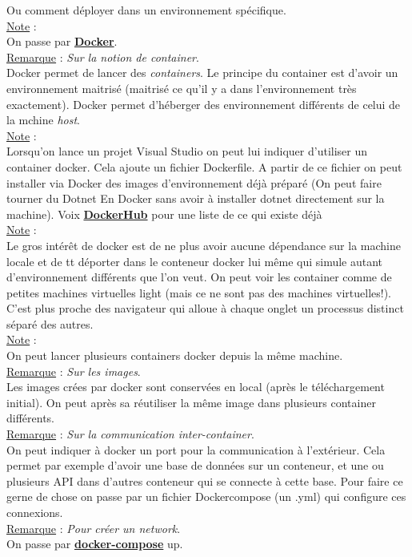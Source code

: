 \documentclass[a4paper,12pt,twoside]{article}
\newcommand{\urlcolor}{magenta}  %
\newcommand{\keycolor}{purple} %
\newcommand{\incode}[1]{{\footnotesize\ttfamily #1}} %
\newcommand{\rem}[2]{\noindent\underline{Remarque} : \textit{#1}.\\ \indent #2}
\newcommand{\note}[1]{\noindent\underline{Note} : \\ \indent #1}
\newcommand{\keyref}[2]{\hypersetup{urlcolor=\keycolor} \href{#1}{\textbf{#2}}\hypersetup{urlcolor=\urlcolor}}
\begin{document}
Ou comment déployer dans un environnement spécifique. \\

\note{On passe par \keyref{https://www.docker.com/get-started}{Docker}.}\\

\rem{Sur la notion de container}{Docker permet de lancer des \textit{containers}. Le principe du container est d'avoir un environnement maitrisé (maitrisé ce qu'il y a dans l'environnement très exactement). Docker permet d'héberger des environnement différents de celui de la mchine \textit{host}.}\\

\note{Lorsqu'on lance un projet Visual Studio on peut lui indiquer d'utiliser un container docker. Cela ajoute un fichier \incode{Dockerfile}. A partir de ce fichier on peut installer via Docker des images d'environnement déjà préparé (On peut faire tourner du Dotnet En Docker sans avoir à installer dotnet directement sur la machine). Voix \keyref{https://docs.docker.com/docker-hub/}{DockerHub} pour une liste de ce qui existe déjà}\\

\note{Le gros intérêt de docker est de ne plus avoir aucune dépendance sur la machine locale et de tt déporter dans le conteneur docker lui même qui simule autant d'environnement différents que l'on veut. On peut voir les container comme de petites machines virtuelles light (mais ce ne sont pas des machines virtuelles!). C'est plus proche des navigateur qui alloue à chaque onglet un processus distinct séparé des autres.}\\

\note{On peut lancer plusieurs containers docker depuis la même machine.}\\

\rem{Sur les images}{Les images crées par docker sont conservées en local (après le téléchargement initial). On peut après sa réutiliser la même image dans plusieurs container différents.}\\

\rem{Sur la communication inter-container}{On peut indiquer à docker un port pour la communication à l'extérieur. Cela permet par exemple d'avoir une base de données sur un conteneur, et une ou plusieurs API dans d'autres conteneur qui se connecte à cette base. Pour faire ce gerne de chose on passe par un fichier Dockercompose (un .yml) qui configure ces connexions.}\\

\rem{Pour créer un network}{On passe par \keyref{https://docs.docker.com/compose/}{docker-compose} up.}\\
\end{document}

